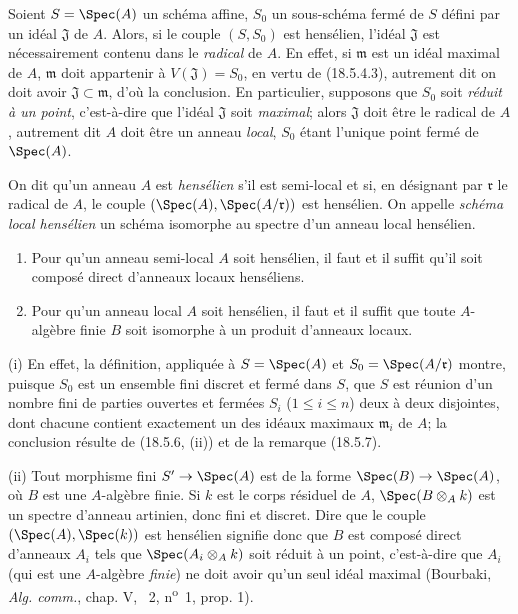 \begin{remark}[18.5.7]
\label{IV.18.5.7}
Soient $S=\Spec(A)$ un schéma affine, $S_0$ un sous-schéma fermé de $S$ défini par un idéal $\mathfrak J$ de $A$. Alors, si le couple $(S,S_0)$ est hensélien, l'idéal $\mathfrak J$ est nécessairement contenu dans le \emph{radical} de $A$. En effet, si $\mathfrak m$ est un idéal maximal de $A$, $\mathfrak m$ doit appartenir à $V(\mathfrak J)=S_0$, en vertu de (18.5.4.3), autrement dit on doit avoir $\mathfrak J\subset\mathfrak m$, d'où la conclusion. En particulier, supposons que $S_0$ soit \emph{réduit à un point}, c'est-à-dire que l'idéal $\mathfrak J$ soit \emph{maximal}; alors $\mathfrak J$ doit être le radical de $A$, autrement dit $A$ doit être un anneau \emph{local}, $S_0$ étant l'unique point fermé de $\Spec(A)$.
\end{remark}

\begin{definition}[18.5.8]
\label{IV.18.5.8}
On dit qu'un anneau $A$ est \emph{hensélien} s'il est semi-local et si, en désignant par $\mathfrak r$ le radical de $A$, le couple $(\Spec(A),\Spec(A/\mathfrak r))$ est hensélien. On appelle \emph{schéma local hensélien} un schéma isomorphe au spectre d'un anneau local hensélien.
\end{definition}

\begin{proposition}[18.5.9]
\label{IV.18.5.9}
\begin{enumerate}
  \item[(i)] Pour qu'un anneau semi-local $A$ soit hensélien, il faut et il suffit qu'il soit composé direct d'anneaux locaux henséliens.
  \item[(ii)] Pour qu'un anneau local $A$ soit hensélien, il faut et il suffit que toute $A$-algèbre finie $B$ soit isomorphe à un produit d'anneaux locaux.
\end{enumerate}
\end{proposition}

(i) En effet, la définition, appliquée à $S=\Spec(A)$ et $S_0=\Spec(A/\mathfrak r)$ montre, puisque $S_0$ est un ensemble fini discret et fermé dans $S$, que $S$ est réunion d'un nombre fini de parties ouvertes et fermées $S_i$ ($1\leq i\leq n$) deux à deux disjointes, dont chacune contient exactement un des idéaux maximaux $\mathfrak m_i$ de $A$; la conclusion résulte de (18.5.6, (ii)) et de la remarque (18.5.7).

(ii) Tout morphisme fini $S'\to\Spec(A)$ est de la forme $\Spec(B)\to\Spec(A)$, où $B$ est une $A$-algèbre finie. Si $k$ est le corps résiduel de $A$, $\Spec(B\otimes_A k)$ est un spectre d'anneau artinien, donc fini et discret. Dire que le couple $(\Spec(A),\Spec(k))$ est hensélien signifie donc que $B$ est composé direct d'anneaux $A_i$ tels que $\Spec(A_i\otimes_A k)$ soit réduit à un point, c'est-à-dire que $A_i$ (qui est une $A$-algèbre \emph{finie}) ne doit avoir qu'un seul idéal maximal (Bourbaki, \emph{Alg. comm.}, chap. V, \textsection~2, n\textsuperscript{o}~1, prop. 1).

